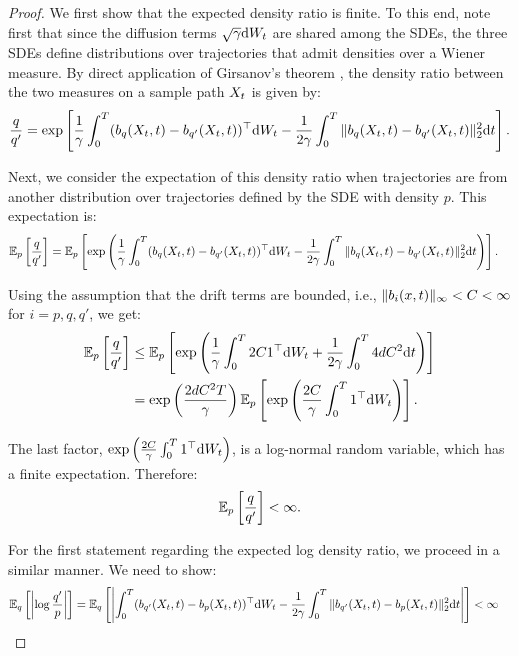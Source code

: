 \begin{proof}
We first show that the expected density ratio is finite. To this end, note first that since the diffusion terms \(\sqrt{\volatility}\de\brownianm\) are shared among the SDEs, the three SDEs define distributions over trajectories that admit densities over a Wiener measure. By direct application of Girsanov's theorem \citep[see e.g.,][]{kailath1971structure}, the density ratio between the two measures on a sample path \(\responseat{\timet}\) is given by:
\[
\frac{q}{q'} = \exp\left[\frac{1}{\volatility} \int_0^T (\drift_{q}(\responseat{\timet}, t) - \drift_{q'}(\responseat{\timet}, t))^{\top} \de\brownianm - \frac{1}{2\volatility} \int_0^T \|\drift_{q}(\responseat{\timet}, t) - \drift_{q'}(\responseat{\timet}, t)\|_2^2 \de t \right].
\]

Next, we consider the expectation of this density ratio when trajectories are from another distribution over trajectories defined by the SDE with density \(p\). This expectation is:
\[
\begin{aligned}
    \E_{p}\left[\frac{q}{q'}\right] &= \E_{p}\left[\exp\left(\frac{1}{\volatility} \int_0^T (\drift_{q}(\responseat{\timet}, t) - \drift_{q'}(\responseat{\timet}, t))^\top \de\brownianm - \frac{1}{2\volatility} \int_0^T \|\drift_{q}(\responseat{\timet}, t) - \drift_{q'}(\responseat{\timet}, t)\|_2^2 \de t\right)\right].
\end{aligned}
\]

Using the assumption that the drift terms are bounded, i.e., \(\|\drift_{i}(x, t)\|_\infty < C < \infty\) for \(i = p, q, q'\), we get:
\[
\begin{aligned}
    \E_{p}\left[\frac{q}{q'}\right] &\le \E_{p}\left[\exp\left(\frac{1}{\volatility} \int_0^T 2C \bm{1}^\top \de\brownianm + \frac{1}{2\volatility} \int_0^T 4dC^2 \de t\right)\right] \\
    &= \exp\left(\frac{2dC^2 T}{\volatility}\right) \E_{p}\left[\exp\left(\frac{2C}{\volatility} \int_0^T \bm{1}^\top \de\brownianm\right)\right].
\end{aligned}
\]

The last factor, \(\exp\left(\frac{2C}{\volatility} \int_0^T \bm{1}^\top \de\brownianm\right)\), is a log-normal random variable, which has a finite expectation. Therefore:
\[
\mathbb{E}_{p}\left[\frac{q}{q'}\right] < \infty.
\]

For the first statement regarding the expected log density ratio, we proceed in a similar manner. We need to show:
\[
\begin{aligned}
    \E_{q}\left[\left|\log \frac{q'}{p}\right|\right] &= \E_{q}\left[\left| \int_0^T (\drift_{q'}(\responseat{\timet}, t) - \drift_{p}(\responseat{\timet}, t))^\top \de\brownianm - \frac{1}{2\volatility} \int_0^T \|\drift_{q'}(\responseat{\timet}, t) - \drift_{p}(\responseat{\timet}, t)\|_2^2 \de t \right|\right] < \infty
\end{aligned}
\]


\end{proof}

